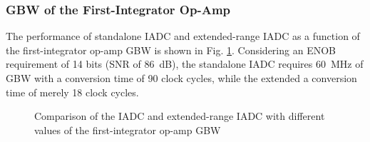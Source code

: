 \subsubsection{GBW of the First-Integrator Op-Amp}
The performance of standalone IADC and extended-range IADC as a function of the first-integrator op-amp GBW is shown in Fig. \ref{SNR_GBW1}. Considering an ENOB requirement of 14 bits (SNR of 86~dB), the standalone IADC requires 60~MHz of GBW with a conversion time of 90 clock cycles, while the extended a conversion time of merely 18 clock cycles.
\begin{figure}
\centering
{}
\hfil
{}
\caption{Comparison of the IADC and extended-range IADC with different values of the first-integrator op-amp GBW}
\label{SNR_GBW1}
\end{figure}

